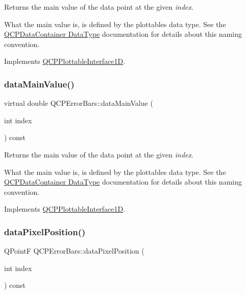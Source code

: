 Returns the main value of the data point at the given {\itshape index}.

What the main value is, is defined by the plottable\textquotesingle{}s data type. See the \hyperlink{class_q_c_p_data_container_qcpdatacontainer-datatype}{Q\+C\+P\+Data\+Container Data\+Type} documentation for details about this naming convention. 

Implements \hyperlink{class_q_c_p_plottable_interface1_d_af6330919e8023277d08c958a6074fc76}{Q\+C\+P\+Plottable\+Interface1D}.

\mbox{\label{class_q_c_p_error_bars_a30170b7bdbfd649e0dd7f79f9a6e62ff}} 
\subsubsection{\texorpdfstring{data\+Main\+Value()}{dataMainValue()}\hspace{0.1cm}{\footnotesize\ttfamily [2/2]}}
{\footnotesize\ttfamily virtual double Q\+C\+P\+Error\+Bars\+::data\+Main\+Value (\begin{DoxyParamCaption}\item[{int}]{index }\end{DoxyParamCaption}) const\hspace{0.3cm}{\ttfamily [virtual]}}

Returns the main value of the data point at the given {\itshape index}.

What the main value is, is defined by the plottable\textquotesingle{}s data type. See the \hyperlink{class_q_c_p_data_container_qcpdatacontainer-datatype}{Q\+C\+P\+Data\+Container Data\+Type} documentation for details about this naming convention. 

Implements \hyperlink{class_q_c_p_plottable_interface1_d_af6330919e8023277d08c958a6074fc76}{Q\+C\+P\+Plottable\+Interface1D}.

\mbox{\label{class_q_c_p_error_bars_a7397bc40751c9c6e2ea188895b2152f8}} 
\subsubsection{\texorpdfstring{data\+Pixel\+Position()}{dataPixelPosition()}\hspace{0.1cm}{\footnotesize\ttfamily [1/2]}}
{\footnotesize\ttfamily Q\+PointF Q\+C\+P\+Error\+Bars\+::data\+Pixel\+Position (\begin{DoxyParamCaption}\item[{int}]{index }\end{DoxyParamCaption}) const\hspace{0.3cm}{\ttfamily [virtual]}}

